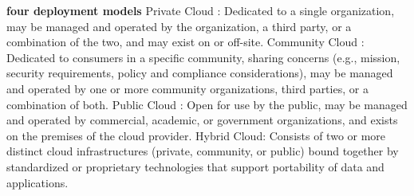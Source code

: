 \documentclass[a4paper,twoside]{scrbook}
\begin{document}
\begin{CJK}{UTF8}{gbsn}
\textbf{four deployment models}
Private Cloud : Dedicated to a single organization, may be managed and operated by the organization, a third party, or a combination of the two, and may exist on or off-site.
Community Cloud : Dedicated to consumers in a specific community, sharing concerns (e.g., mission, security requirements, policy and compliance considerations), may be managed and operated by one or more community organizations, third parties, or a combination of both.
Public Cloud : Open for use by the public, may be managed and operated by commercial, academic, or government organizations, and exists on the premises of the cloud provider.
Hybrid Cloud: Consists of two or more distinct cloud infrastructures (private, community, or public) bound together by standardized or proprietary technologies that support portability of data and applications.



\end{CJK}
\end{document}
